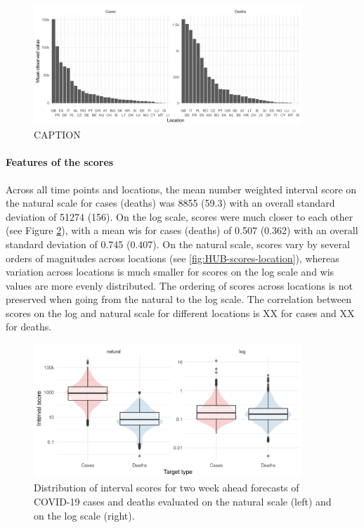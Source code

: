 \documentclass{article}
\begin{document}
\begin{figure}[h!]
    \centering
    \includegraphics[width=0.9\textwidth]{output/figures/HUB-mean-obs-location.png}
    \caption{CAPTION}
    \label{fig:HUB-mean-locations}
\end{figure}

\paragraph{Features of the scores}
Across all time points and locations, the mean number weighted interval score on the natural scale for cases (deaths) was 8855 (59.3) with an overall standard deviation of 51274 (156). On the log scale, scores were much closer to each other (see Figure \ref{fig:HUB-average-scores}), with a mean wis for cases (deaths) of 0.507 (0.362) with an overall standard deviation of 0.745 (0.407). 
On the natural scale, scores vary by several orders of magnitudes across locations (see \ref{fig:HUB-scores-location}), whereas variation across locations is much smaller for scores on the log scale and wis values are more evenly distributed. The ordering of scores across locations is not preserved when going from the natural to the log scale. 
The correlation between scores on the log and natural scale for different locations is XX for cases and XX for deaths. 

\begin{figure}[h!]
    \centering
    \includegraphics[width=0.9\textwidth]{output/figures/HUB-average-scores.png}
    \caption{Distribution of interval scores for two week ahead forecasts of COVID-19 cases and deaths evaluated on the natural scale (left) and on the log scale (right). }
    \label{fig:HUB-average-scores}
\end{figure}
\end{document}
